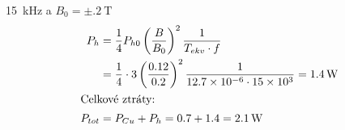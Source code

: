 \begin{example}
\begin{enumerate}[noitemsep]
          \SI{15}{\kilo\Hz}\) a \(B_0 = \pm\SI{.2}{\tesla}\)
          \begin{align*}
            P_{h}   &= \frac{1}{4}P_{h0}\left(\frac{B}{B_0}\right)^2\frac{1}{T_{ekv}\cdot f} \\
                    &= \frac{1}{4}\cdot\num{3}\left(\frac{\num{.12}}{\num{.2}}\right)^2
                       \frac{1}{\num{12.7d-6}\cdot\num{15d3}} = \SI{1.4}{\watt}              \\
            \shortintertext{Celkové ztráty:}
            P_{tot} &= P_{Cu} + P_{h} = \num{.7} + \num{1.4} = \SI{2.1}{\watt}
          \end{align*}
  \end{enumerate}
\end{example}

